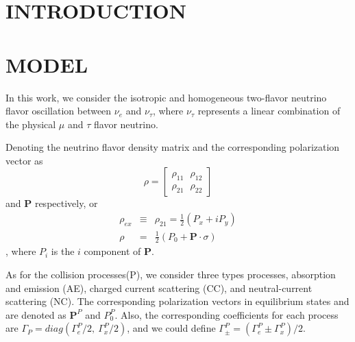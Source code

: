 \documentclass[aps,prd,twocolumn,amsmath,amssymb,groupedaddress]{revtex4-2}
\begin{document}
\maketitle

\section{\label{sec:intro} INTRODUCTION}

\subsection{}
\subsubsection{}

\section{\label{sec:model} MODEL}
In this work, we consider the isotropic and homogeneous two-flavor neutrino flavor oscillation between $\nu_e$ and $\nu_\tau$, where $\nu_\tau$ represents a linear combination of the physical $\mu$ and $\tau$ flavor neutrino.

Denoting the neutrino flavor density matrix and the corresponding polarization vector as
\begin{equation}
	\rho = \begin{bmatrix}
		\rho_{11} ~~~ \rho_{12} \\
		\rho_{21} ~~~ \rho_{22}
	\end{bmatrix}
\end{equation}
and $\textbf{P}$ respectively, or
\begin{eqnarray}
	\rho_{ex} &\equiv& \rho_{21} = \frac{1}{2}\left(P_x + i P_y\right) \\
    \rho &=& \frac{1}{2} \left(P_0+\textbf{P} \cdot \sigma\right)
\end{eqnarray}, where $P_i$ is the $i$ component of $\textbf{P}$. 

As for the collision processes(P), we consider three types processes, absorption and emission (AE), charged current
scattering (CC), and neutral-current scattering (NC). The corresponding polarization vectors in equilibrium states and  are denoted as $\textbf{P}^{P}$ and $P_0^P$. Also, the corresponding coefficients for each process are $\Gamma_{P} = diag \left(\Gamma^{P}_e/2, ~\Gamma^{P}_x/2 \right)$, and we could define $\Gamma^{P}_\pm = \left(\Gamma^{P}_e \pm  \Gamma^{P}_x\right)/2$.
\end{document}
